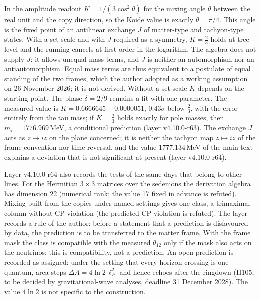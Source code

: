 In the amplitude readout $K=1/(3\cos^2\theta)$ for the mixing angle
$\theta$ between the real unit and the copy direction, so the Koide
value is exactly $\theta=\pi/4$. This angle is the fixed point of an
antilinear exchange $J$ of matter-type and tachyon-type states. With a
set scale and with $J$ required as a symmetry, $K=\tfrac23$ holds at
tree level and the running cancels at first order in the logarithm. The algebra
does not supply $J$: it allows unequal mass terms, and $J$ is neither
an automorphism nor an antiautomorphism. Equal mass terms are thus
equivalent to a postulate of equal standing of the two frames, which
the author adopted as a working assumption on 26 November 2026; it is
not derived. Without a set scale $K$ depends on the starting point.
The phase $\delta=2/9$ remains a fit with one parameter. The measured
value is $K=0.6666645\pm0.0000051$, $0.43\sigma$ below $\tfrac23$, with
the error entirely from the tau mass; if $K=\tfrac23$ holds exactly for
pole masses, then $m_\tau=1776.969$\,MeV, a conditional prediction
(layer v4.10.0-r63). The exchange $J$ acts as $z\mapsto i\bar z$ on the
plane concerned; it is neither the tachyon map $z\mapsto iz$ of the
frame convention nor time reversal, and the value $1777.134$\,MeV of
the main text explains a deviation that is not significant at present
(layer v4.10.0-r64).

Layer v4.10.0-r64 also records the tests of the same days that belong
to other lines. For the Hermitian $3\times3$ matrices over the
sedenions the derivation algebra has dimension 22 (numerical rank; the
value 17 fixed in advance is refuted). Mixing built from the copies
under named settings gives one class, a trimaximal column without CP
violation (the predicted CP violation is refuted). The layer records a
rule of the author: before a statement that a prediction is disfavoured
by data, the prediction is to be transferred to the matter frame. With
the frame mask the class is compatible with the measured
$\theta_{12}$ only if the mask also acts on the neutrinos; this is
compatibility, not a prediction. An open prediction is recorded as
assigned: under the setting that every horizon crossing is one quantum,
area steps $\Delta A=4\ln2\,\ell_P^2$ and hence echoes after the
ringdown (H105, to be decided by gravitational-wave analyses, deadline
31 December 2028). The value $4\ln2$ is not specific to the
construction.

